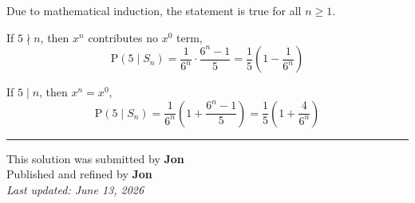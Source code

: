 \documentclass[12pt]{article}
\begin{document}
Due to mathematical induction, the statement is true for all $n\geq1$.

If $5\nmid n$, then $x^n$ contributes no $x^0$ term,
$$\mathrm{P}(5\mid S_n)=\frac1{6^n}\cdot\frac{6^n-1}{5}=\boxed{\frac15\left(1-\frac1{6^n}\right)}$$

If $5\mid n$, then $x^n=x^0$,
$$\mathrm{P}(5\mid S_n)=\frac1{6^n}
\left(1+\frac{6^n-1}{5}\right)=\boxed{\frac15\left(1+\frac4{6^n}\right)}$$

\bigskip
\hrule
\begin{center}
    This solution was submitted by \textbf{Jon}\\[4pt]
    Published and refined by \textbf{Jon}\\[8pt]
    \textit{Last updated: June 13, 2026}
\end{center}
\end{document}
